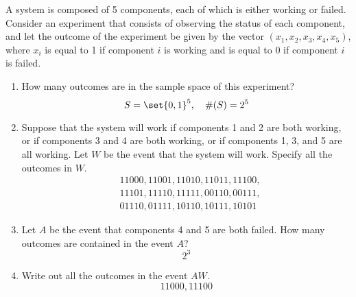 \item A system is composed of 5 components, each of which is either working or failed. Consider an experiment that consists of observing the status of each component, and let the outcome of the experiment be given by the vector $(x_1, x_2, x_3, x_4, x_5)$, where $x_i$ is equal to 1 if component $i$ is working and is equal to 0 if component $i$ is failed.
\begin{enumerate}
    \item How many outcomes are in the sample space of this experiment?
    \[ S = \set{0,1}^5,\quad \#(S) = 2^5 \]
    \item Suppose that the system will work if components 1 and 2 are both working, or if components 3 and 4 are both working, or if components 1, 3, and 5 are all working. Let $W$ be the event that the system will work. Specify all the outcomes in $W$.
    \begin{align*}
        &11000,11001,11010,11011,11100,\\
        &11101,11110,11111,00110,00111,\\
        &01110,01111,10110,10111,10101
    \end{align*}
    \item Let $A$ be the event that components 4 and 5 are both failed. How many outcomes are contained in the event $A$?
    \[ 2^3 \]
    \item Write out all the outcomes in the event $AW$.
    \[
        11000,11100
    \]
\end{enumerate}